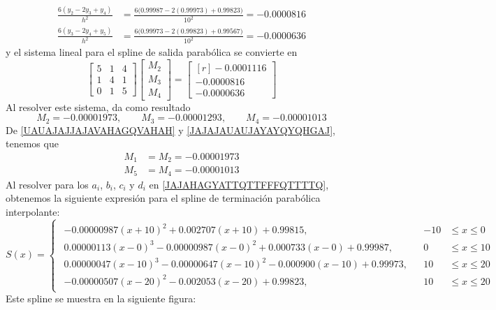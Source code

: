 \begin{example}
\begin{align*}
        \frac{6(y_2 - 2y_3 + y_4)}{h^2} & = \frac{6\big(0.99987 - 2(0.99973) + 0.99823\big)}{10^2} = -0.0000816 \\
        \frac{6(y_3 - 2y_4 + y_5)}{h^2} & = \frac{6\big(0.99973 - 2(0.99823) + 0.99567\big)}{10^2} = -0.0000636
    \end{align*}
    y el sistema lineal para el spline de salida parabólica se convierte en
    $$\begin{bmatrix}
        5 & 1 & 4 \\
        1 & 4 & 1 \\
        0 & 1 & 5
    \end{bmatrix} \begin{bmatrix}
        M_2 \\
        M_3 \\
        M_4
    \end{bmatrix} = \begin{bmatrix*}[r]
        -0.0001116 \\
        -0.0000816 \\
        -0.0000636
    \end{bmatrix*}$$
    Al resolver este sistema, da como resultado
    $$M_2 = -0.00001973, \qquad M_3 = -0.00001293, \qquad M_4 = -0.00001013$$
    De \eqref{UAUAJAJJAJAVAHAGQVAHAH} y \eqref{JAJAJAUAUJAYAYQYQHGAJ}, tenemos que
    \begin{align*}
        M_1 & = M_2 = -0.00001973 \\
        M_5 & = M_4 = -0.00001013
    \end{align*}
    Al resolver para los $a_i$, $b_i$, $c_i$ y $d_i$ en \eqref{JAJAHAGYATTQTTFFFQTTTTQ}, obtenemos la siguiente expresión para el spline de terminación parabólica interpolante:
    $$S(x) = \begin{cases}
        \begin{aligned}
            -0.00000987(x + 10)^2 + 0.002707(x + 10) + 0.99815, & & -10 & \leq x \leq 0 \\
            0.00000113(x - 0)^3 - 0.00000987(x - 0)^2 + 0.000733(x - 0) + 0.99987, & & 0 & \leq x \leq 10 \\
            0.00000047(x - 10)^3 - 0.00000647(x - 10)^2 - 0.000900(x - 10) + 0.99973, & & 10 & \leq x \leq 20 \\
            - 0.00000507(x - 20)^2 - 0.002053(x - 20) + 0.99823, & & 10 & \leq x \leq 20
        \end{aligned}
    \end{cases}$$
    Este spline se muestra en la siguiente figura:
    \begin{center}

\end{center}
\end{example}
